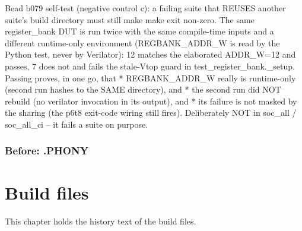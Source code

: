 \begin{record}
\begin{textblock}
Bead b079 self-test (negative control c): a failing suite that REUSES another suite's build
directory must still make make exit non-zero.  The same register_bank DUT is run twice with the
same compile-time inputs and a different runtime-only environment (REGBANK_ADDR_W is read by the
Python test, never by Verilator): 12 matches the elaborated ADDR_W=12 and passes, 7 does not and
fails the stale-Vtop guard in test_register_bank._setup.  Passing proves, in one go, that
  * REGBANK_ADDR_W really is runtime-only (second run hashes to the SAME directory), and
  * the second run did NOT rebuild (no verilator invocation in its output), and
  * its failure is not masked by the sharing (the p6t8 exit-code wiring still fires).
Deliberately NOT in soc_all / soc_all_ci -- it fails a suite on purpose.
\end{textblock}

\subsection*{Before: .PHONY}


\end{record}

\chapter{Build files}\label{cr:ch:build-files}

This chapter holds the history text of the build files.

